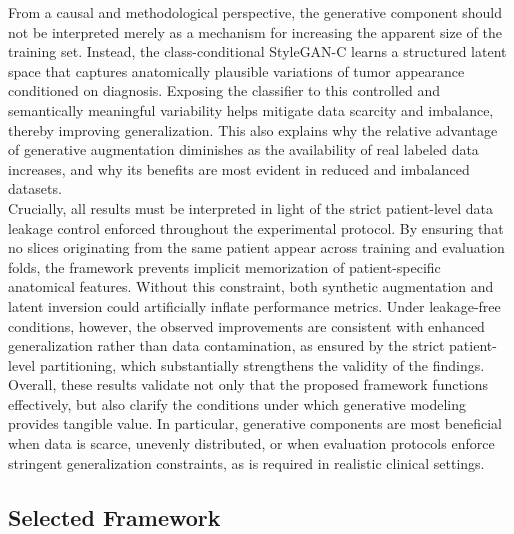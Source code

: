 From a causal and methodological perspective, the generative component should not be interpreted merely as a mechanism for increasing the apparent size of the training set. Instead, the class-conditional StyleGAN-C learns a structured latent space that captures anatomically plausible variations of tumor appearance conditioned on diagnosis. Exposing the classifier to this controlled and semantically meaningful variability helps mitigate data scarcity and imbalance, thereby improving generalization. This also explains why the relative advantage of generative augmentation diminishes as the availability of real labeled data increases, and why its benefits are most evident in reduced and imbalanced datasets.\\

Crucially, all results must be interpreted in light of the strict patient-level data leakage control enforced throughout the experimental protocol. By ensuring that no slices originating from the same patient appear across training and evaluation folds, the framework prevents implicit memorization of patient-specific anatomical features. Without this constraint, both synthetic augmentation and latent inversion could artificially inflate performance metrics. Under leakage-free conditions, however, the observed improvements are consistent with enhanced generalization rather than data contamination, as ensured by the strict patient-level partitioning, which substantially strengthens the validity of the findings.\\

Overall, these results validate not only that the proposed framework functions effectively, but also clarify the conditions under which generative modeling provides tangible value. In particular, generative components are most beneficial when data is scarce, unevenly distributed, or when evaluation protocols enforce stringent generalization constraints, as is required in realistic clinical settings.


\subsection{Selected Framework}

